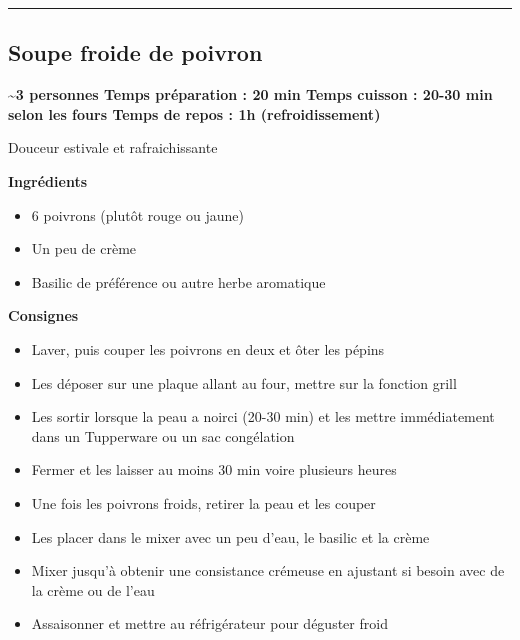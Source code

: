 \documentclass[]{book}
\providecommand{\tightlist}{%
  \setlength{\itemsep}{0pt}\setlength{\parskip}{0pt}}
\begin{document}
\begin{center}\rule{0.5\linewidth}{0.5pt}\end{center}

\hypertarget{soupe-froide-de-poivron}{%
\subsection*{\texorpdfstring{{Soupe froide de poivron}}{Soupe froide de poivron}}\label{soupe-froide-de-poivron}}

\begin{salebox}
\textbf{\textasciitilde{}3 personnes \textbar{} Temps préparation : 20
min \textbar{} Temps cuisson : 20-30 min selon les fours\textbar{} Temps
de repos : 1h (refroidissement)}

Douceur estivale et rafraichissante
\end{salebox}

\textbf{Ingrédients}

\begin{itemize}
\tightlist
\item
  6 poivrons (plutôt rouge ou jaune)
\item
  Un peu de crème
\item
  Basilic de préférence ou autre herbe aromatique
\end{itemize}

\textbf{Consignes}

\begin{itemize}
\tightlist
\item
  Laver, puis couper les poivrons en deux et ôter les pépins
\item
  Les déposer sur une plaque allant au four, mettre sur la fonction grill
\item
  Les sortir lorsque la peau a noirci (20-30 min) et les mettre immédiatement dans un Tupperware ou un sac congélation
\item
  Fermer et les laisser au moins 30 min voire plusieurs heures
\item
  Une fois les poivrons froids, retirer la peau et les couper
\item
  Les placer dans le mixer avec un peu d'eau, le basilic et la crème
\item
  Mixer jusqu'à obtenir une consistance crémeuse en ajustant si besoin avec de la crème ou de l'eau
\item
  Assaisonner et mettre au réfrigérateur pour déguster froid
\end{itemize}
\end{document}

